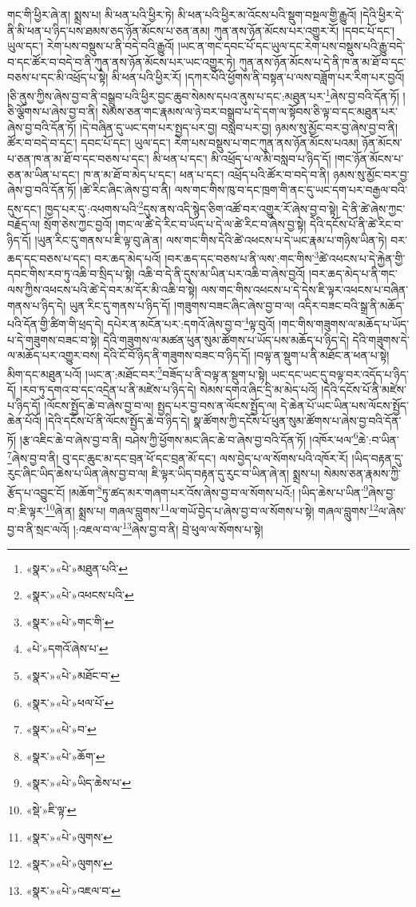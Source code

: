 གང་གི་ཕྱིར་ཞེ་ན། སྨྲས་པ། མི་ཕན་པའི་ཕྱིར་ཏེ། མི་ཕན་པའི་ཕྱིར་མ་འོངས་པའི་སྡུག་བསྔལ་གྱི་རྒྱུའོ། །དེའི་ཕྱིར་དེ་ནི་མི་ཕན་པ་ཉིད་པས་ཐམས་ཅད་ཉོན་མོངས་པ་ཅན་ནམ། ཀུན་ནས་ཉོན་མོངས་པར་འགྱུར་རོ། །དབང་པོ་དང་། ཡུལ་དང་། རེག་པས་བསྡུས་པ་ནི་བདེ་བའི་རྒྱུའོ། །ཡང་ན་གང་དབང་པོ་དང་ཡུལ་དང་རེག་པས་བསྡུས་པའི་རྒྱུ་བདེ་བ་དང་ཚོར་བ་བདེ་བ་ནི་ཀུན་ནས་ཉོན་མོངས་པར་ཡང་འགྱུར་ཏེ། ཀུན་ནས་ཉོན་མོངས་པ་དེ་ནི་ཁ་ན་མ་ཐོ་བ་དང་བཅས་པ་དང་མི་འཕྲོད་པ་སྟེ། མི་ཕན་པའི་ཕྱིར་རོ། །དཀར་པོའི་ཕྱོགས་ནི་བསྟན་པ་ལས་བཟློག་པར་རིག་པར་བྱའོ། །ཅི་ནུས་ཀྱིས་ཞེས་བྱ་བ་ནི་བསྒྲུབ་པའི་ཕྱིར་བྱང་ཆུབ་སེམས་དཔའ་ནུས་པ་དང་:མཐུན་པར་\footnote{«སྣར་»«པེ་»མཐུན་པའི་}ཞེས་བྱ་བའི་དོན་ཏོ། །ཅི་ལྕོགས་པ་ཞེས་བྱ་བ་ནི། སེམས་ཅན་གང་རྣམས་ལ་ཉེ་བར་བསྒྲུབ་པ་དེ་དག་ལ་སྟོབས་ཅི་ལྟ་བ་དང་མཐུན་པར་ཞེས་བྱ་བའི་དོན་ཏོ། །དེ་བཞིན་དུ་ཡང་དག་པར་སྤྱད་པར་བྱ། བསླབ་པར་བྱ། ཉམས་སུ་མྱོང་བར་བྱ་ཞེས་བྱ་བ་ནི། ཚོར་བ་བདེ་བ་དང་། དབང་པོ་དང་། ཡུལ་དང་། རེག་པས་བསྡུས་པ་གང་ཀུན་ནས་ཉོན་མོངས་པའམ། ཉོན་མོངས་པ་ཅན་ཁ་ན་མ་ཐོ་བ་དང་བཅས་པ་དང་། མི་ཕན་པ་དང་། མི་འཕྲོད་པ་ལ་མི་བསླབ་པ་ཉིད་དོ། །གང་ཉོན་མོངས་པ་ཅན་མ་ཡིན་པ་དང་། ཁ་ན་མ་ཐོ་བ་མེད་པ་དང་། ཕན་པ་དང་། འཕྲོད་པའི་ཚོར་བ་བདེ་བ་ནི། ཉམས་སུ་མྱོང་བར་བྱ་ཞེས་བྱ་བའི་དོན་ཏོ། །ཚེ་རིང་ཞིང་ཞེས་བྱ་བ་ནི། ལས་གང་གིས་ཁུ་བ་དང་ཁྲག་གི་ནང་དུ་ཡང་དག་པར་བརྒྱལ་བའི་དུས་དང་། ཁྱད་པར་དུ་:འཕགས་པའི་\footnote{«སྣར་»«པེ་»འཕངས་པའི་}དུས་ནས་འདི་སྙེད་ཅིག་འཚོ་བར་འགྱུར་རོ་ཞེས་བྱ་བ་སྟེ། དེ་ནི་ཚེ་ཞེས་ཀྱང་བརྗོད་ལ། སྲོག་ཅེས་ཀྱང་བྱའོ། །གང་ལ་ཚེ་དེ་རིང་བ་ཡོད་པ་དེ་ལ་ཚེ་རིང་བ་ཞེས་བྱ་སྟེ། དེའི་དངོས་པོ་ནི་ཚེ་རིང་བ་ཉིད་དོ། །ཡུན་རིང་དུ་གནས་པ་ཇི་ལྟ་བུ་ཞེ་ན། ལས་གང་གིས་དེའི་ཚེ་འཕངས་པ་དེ་ཡང་རྣམ་པ་གཉིས་ཡིན་ཏེ། བར་ཆད་དང་བཅས་པ་དང་། བར་ཆད་མེད་པའོ། །བར་ཆད་དང་བཅས་པ་ནི་ལས་:གང་གིས་\footnote{«སྣར་»«པེ་»གང་གི་}ཚེ་འཕངས་པ་དེ་རྐྱེན་གྱི་དབང་གིས་རབ་ཏུ་འཆི་བ་སྲིད་པ་སྟེ། འཆི་བ་དེ་ནི་དུས་མ་ཡིན་པར་འཆི་བ་ཞེས་བྱའོ། །བར་ཆད་མེད་པ་ནི་གང་ལས་ཀྱིས་འཕངས་པའི་ཚེ་དེ་བར་མ་དོར་མི་འཆི་བ་སྟེ། ལས་གང་གིས་འཕངས་པ་དེ་དེས་ཇི་ལྟར་འཕངས་པ་བཞིན་གནས་པ་ཉིད་དེ། ཡུན་རིང་དུ་གནས་པ་ཉིད་དོ། །གཟུགས་བཟང་ཞིང་ཞེས་བྱ་བ་ལ། འདིར་བཟང་བའི་སྒྲ་ནི་མཆོད་པའི་དོན་གྱི་ཚིག་གི་ཕྲད་དེ། དཔེར་ན་མངོན་པར་:དགའོ་ཞེས་བྱ་བ་\footnote{«པེ་»དགའོ་ཞེས་པ་}ལྟ་བུའོ། །གང་གིས་གཟུགས་ལ་མཆོད་པ་ཡོད་པ་དེ་གཟུགས་བཟང་བ་སྟེ། དེའི་གཟུགས་ལ་མཚན་ཕུན་སུམ་ཚོགས་པ་ཡོད་པས་མཆོད་པ་ཉིད་དེ། དེའི་གཟུགས་དེ་ལ་མཆོད་པར་འགྱུར་བས། དེའི་ངོ་བོ་ཉིད་ནི་གཟུགས་བཟང་བ་ཉིད་དོ། །བལྟ་ན་སྡུག་པ་ནི་མཐོང་ན་ཕན་པ་སྟེ། མིག་དང་མཐུན་པའོ། །ཡང་ན་:མཐོང་བར་\footnote{«སྣར་»«པེ་»མཐོང་བ་}བཟོད་པ་ནི་བལྟ་ན་སྡུག་པ་སྟེ། ཡང་དང་ཡང་དུ་བལྟ་བར་འདོད་པ་ཉིད་དོ། །རབ་ཏུ་དགའ་བ་དང་འདྲེན་པ་ནི་མཛེས་པ་ཉིད་དེ། སེམས་དགའ་ཞིང་དྲི་མ་མེད་པའོ། །དེའི་དངོས་པོ་ནི་མཛེས་པ་ཉིད་དོ། །ལོངས་སྤྱོད་ཆེ་བ་ཞེས་བྱ་བ་ལ། སྤྱད་པར་བྱ་བས་ན་ལོངས་སྤྱོད་ལ། དེ་ཆེན་པོ་ཡང་ཡིན་པས་ལོངས་སྤྱོད་ཆེན་པོའོ། །དེའི་དངོས་པོ་ནི་ལོངས་སྤྱོད་ཆེ་བ་ཉིད་དེ། སྣ་ཚོགས་ཀྱི་དངོས་པོ་ཕུན་སུམ་ཚོགས་པ་ཞེས་བྱ་བའི་དོན་ཏོ། །རྩ་འཇིང་ཆེ་བ་ཞེས་བྱ་བ་ནི། བཤེས་ཀྱི་ཕྱོགས་མང་ཞིང་ཆེ་བ་ཞེས་བྱ་བའི་དོན་ཏོ། །འཁོར་ཕལ་\footnote{«སྣར་»«པེ་»ཕལ་པོ་}ཆེ་:བ་ཡིན་\footnote{«སྣར་»«པེ་»བ་}ཞེས་བྱ་བ་ནི། བུ་དང་ཆུང་མ་དང་བྲན་ཕོ་དང་བྲན་མོ་དང་། ལས་བྱེད་པ་ལ་སོགས་པའི་འཁོར་རོ། །ཡིད་བརྟན་དུ་རུང་ཞིང་ཡིད་ཆེས་པ་ཡིན་ཞེས་བྱ་བ་ལ། ཇི་ལྟར་ཡིད་བརྟན་དུ་རུང་བ་ཡིན་ཞེ་ན། སྨྲས་པ། སེམས་ཅན་རྣམས་ཀྱི་རྩོད་པ་འབྱུང་ངོ། །མཆོག་\footnote{«སྣར་»«པེ་»ཆོག་}ཏུ་ཚད་མར་གཞག་པར་འོས་ཞེས་བྱ་བ་ལ་སོགས་པའོ:། །ཡིད་ཆེས་པ་ཡིན་\footnote{«སྣར་»«པེ་»ཡིད་ཆེས་པ་}ཞེས་བྱ་བ་:ཇི་ལྟར་\footnote{«སྡེ་»ཇི་ལྟ་}ཞེ་ན། སྨྲས་པ། གཞལ་བླུགས་\footnote{«སྣར་»«པེ་»ལུགས་}ལ་གཡོ་བྱེད་པ་ཞེས་བྱ་བ་ལ་སོགས་པ་སྟེ། གཞལ་བླུགས་\footnote{«སྣར་»«པེ་»ལུགས་}ལ་ཞེས་བྱ་བ་ནི་སྲང་ལའོ། །:འཇལ་བ་ལ་\footnote{«སྣར་»«པེ་»འཇལ་བ་}ཞེས་བྱ་བ་ནི། བྲེ་ཕུལ་ལ་སོགས་པ་སྟེ། 